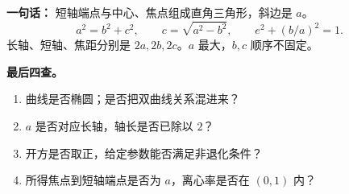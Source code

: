 \begin{summarybox}
\textbf{一句话：} 短轴端点与中心、焦点组成直角三角形，斜边是 $a$。
\[
a^2=b^2+c^2,\qquad c=\sqrt{a^2-b^2},\qquad e^2+(b/a)^2=1.
\]
长轴、短轴、焦距分别是 $2a,2b,2c$。$a$ 最大，$b,c$ 顺序不固定。

\textbf{最后四查。}
\begin{enumerate}[leftmargin=*]
\item 曲线是否椭圆；是否把双曲线关系混进来？
\item $a$ 是否对应长轴，轴长是否已除以 $2$？
\item 开方是否取正，给定参数能否满足非退化条件？
\item 所得焦点到短轴端点是否为 $a$，离心率是否在 $(0,1)$ 内？
\end{enumerate}
\end{summarybox}
